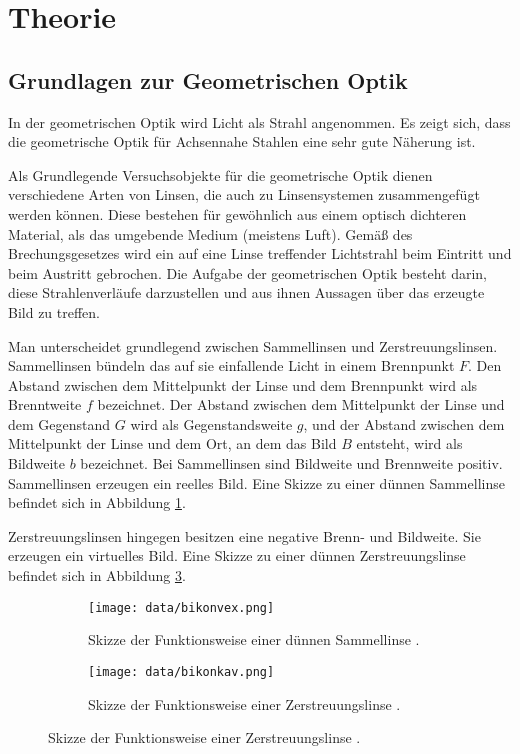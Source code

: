 \section{Theorie}
\label{sec:Theorie}

\subsection{Grundlagen zur Geometrischen Optik}
\label{subsec:Grundlagen}
In der geometrischen Optik wird Licht als Strahl angenommen. Es zeigt sich, dass
die geometrische Optik für Achsennahe Stahlen eine sehr gute Näherung ist.

Als Grundlegende Versuchsobjekte für die geometrische Optik dienen verschiedene Arten von Linsen, die
auch zu Linsensystemen zusammengefügt werden können. Diese bestehen für gewöhnlich aus einem optisch
dichteren Material, als das umgebende Medium (meistens Luft). Gemäß des Brechungsgesetzes wird
ein auf eine Linse treffender Lichtstrahl beim Eintritt und beim Austritt gebrochen. Die Aufgabe
der geometrischen Optik besteht darin, diese Strahlenverläufe darzustellen und aus ihnen
Aussagen über das erzeugte Bild zu treffen.

Man unterscheidet grundlegend zwischen Sammellinsen und Zerstreuungslinsen. Sammellinsen bündeln
das auf sie einfallende Licht in einem Brennpunkt $F$. Den Abstand zwischen dem Mittelpunkt
der Linse und dem Brennpunkt wird als Brenntweite $f$ bezeichnet. Der Abstand zwischen dem
Mittelpunkt der Linse und dem Gegenstand $G$ wird als Gegenstandsweite $g$, und der Abstand
zwischen dem Mittelpunkt der Linse und dem Ort, an dem das Bild $B$ entsteht, wird als
Bildweite $b$ bezeichnet. Bei Sammellinsen sind Bildweite und Brennweite positiv.
Sammellinsen erzeugen ein reelles Bild. Eine Skizze zu einer dünnen Sammellinse befindet sich in Abbildung
\ref{fig:bikonvex}.

Zerstreuungslinsen hingegen besitzen eine negative Brenn- und Bildweite. Sie erzeugen ein
virtuelles Bild. Eine Skizze zu einer dünnen Zerstreuungslinse befindet sich in Abbildung
\ref{fig:bikonkav}.

\begin{figure}
  \centering
  \begin{subfigure}{0.48\textwidth}
    \texttt{[image: data/bikonvex.png]}
    \caption{Skizze der Funktionsweise einer dünnen Sammellinse \cite{Versuchsanleitung}.}
    \label{fig:bikonvex}
  \end{subfigure}
  \begin{subfigure}{0.48\textwidth}
    \centering
    \texttt{[image: data/bikonkav.png]}
    \caption{Skizze der Funktionsweise einer Zerstreuungslinse \cite{Versuchsanleitung}.}
    \label{fig:bikonkav}
  \end{subfigure}
\end{figure}

